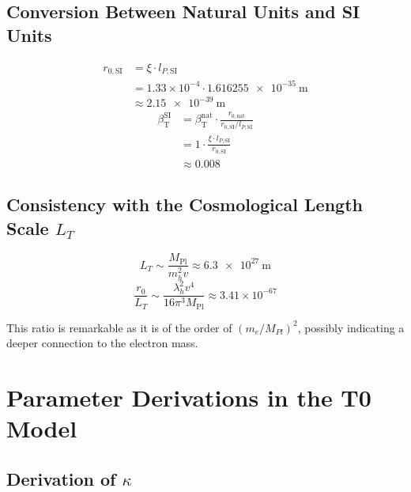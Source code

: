 ﻿\documentclass[12pt,a4paper]{article}
\newcommand{\Mpl}{M_{\text{Pl}}}
\newcommand{\betaT}{\beta_{\text{T}}}
\begin{document}
	\subsection{Conversion Between Natural Units and SI Units}
	
	\begin{align}
		r_{0,\text{SI}} &= \xi \cdot l_{P,\text{SI}} \\
		&= 1.33 \times 10^{-4} \cdot \SI{1.616255e-35}{\meter} \\
		&\approx \SI{2.15e-39}{\meter}
	\end{align}
	\begin{align}
		\betaT^{\text{SI}} &= \betaT^{\text{nat}} \cdot \frac{r_{0,\text{nat}}}{r_{0,\text{SI}}/l_{P,\text{SI}}} \\
		&= 1 \cdot \frac{\xi \cdot l_{P,\text{SI}}}{r_{0,\text{SI}}} \\
		&\approx 0.008
	\end{align}
	
	\subsection{Consistency with the Cosmological Length Scale \(L_T\)}
	
	\begin{equation}
		L_T \sim \frac{\Mpl}{m_h^2 v} \approx \SI{6.3e27}{\meter}
	\end{equation}
	\begin{equation}
		\frac{r_0}{L_T} \sim \frac{\lambda_h^2 v^4}{16\pi^3 \Mpl} \approx 3.41 \times 10^{-67}
	\end{equation}
	
	This ratio is remarkable as it is of the order of \((m_e/M_{Pl})^2\), possibly indicating a deeper connection to the electron mass.
	
	\section{Parameter Derivations in the T0 Model}
	
	\subsection{Derivation of \(\kappa\)}
	
\end{document}
